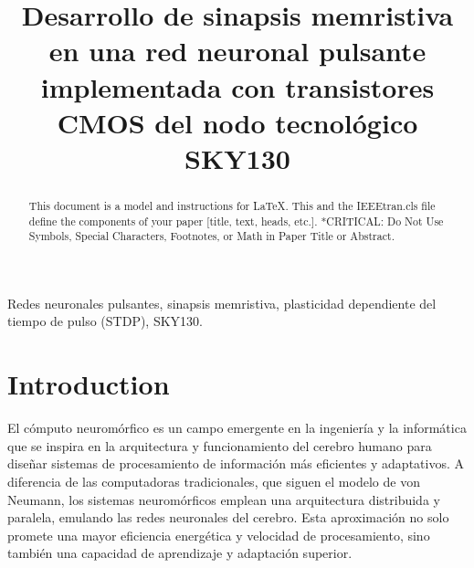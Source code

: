 \documentclass[conference]{IEEEtran}
\begin{document}
\title{Desarrollo de sinapsis memristiva en una red neuronal pulsante implementada con transistores CMOS del nodo tecnológico SKY130\\
}

\author{
\and
{}
\and
{}
}

\maketitle

\begin{abstract}
This document is a model and instructions for \LaTeX.
This and the IEEEtran.cls file define the components of your paper [title, text, heads, etc.]. *CRITICAL: Do Not Use Symbols, Special Characters, Footnotes, 
or Math in Paper Title or Abstract.
\end{abstract}

\begin{IEEEkeywords}
Redes neuronales pulsantes, sinapsis memristiva, plasticidad dependiente del tiempo de pulso (STDP), SKY130.
\end{IEEEkeywords}

\section{Introduction}
El cómputo neuromórfico es un campo emergente en la ingeniería y la informática que se inspira en la arquitectura y funcionamiento del cerebro humano para diseñar sistemas de procesamiento de información más eficientes y adaptativos. A diferencia de las computadoras tradicionales, que siguen el modelo de von Neumann, los sistemas neuromórficos emplean una arquitectura distribuida y paralela, emulando las redes neuronales del cerebro. Esta aproximación no solo promete una mayor eficiencia energética y velocidad de procesamiento, sino también una capacidad de aprendizaje y adaptación superior.
\end{document}
